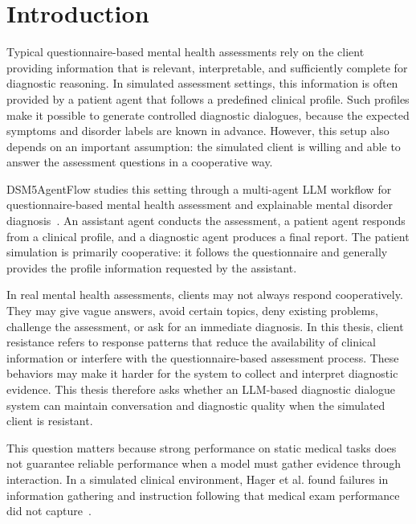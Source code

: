 \section{Introduction}\label{s:intro}


Typical questionnaire-based mental health assessments rely on the client providing information that is relevant, interpretable, and sufficiently complete for diagnostic reasoning. In simulated assessment settings, this information is often provided by a patient agent that follows a predefined clinical profile. Such profiles make it possible to generate controlled diagnostic dialogues, because the expected symptoms and disorder labels are known in advance. However, this setup also depends on an important assumption: the simulated client is willing and able to answer the assessment questions in a cooperative way.

DSM5AgentFlow studies this setting through a multi-agent LLM workflow for questionnaire-based mental health assessment and explainable mental disorder diagnosis~\cite{ozgun2025trustworthyaipsychotherapymultiagent}. An assistant agent conducts the assessment, a patient agent responds from a clinical profile, and a diagnostic agent produces a final report. The patient simulation is primarily cooperative: it follows the questionnaire and generally provides the profile information requested by the assistant.


In real mental health assessments, clients may not always respond cooperatively. They may give vague answers, avoid certain topics, deny existing problems, challenge the assessment, or ask for an immediate diagnosis. In this thesis, client resistance refers to response patterns that reduce the availability of clinical information or interfere with the questionnaire-based assessment process. These behaviors may make it harder for the system to collect and interpret diagnostic evidence. This thesis therefore asks whether an LLM-based diagnostic dialogue system can maintain conversation and diagnostic quality when the simulated client is resistant.

This question matters because strong performance on static medical tasks does not guarantee reliable performance when a model must gather evidence through interaction. In a simulated clinical environment, Hager et al. found failures in information gathering and instruction following that medical exam performance did not capture~\cite{hager2024clinical}.



